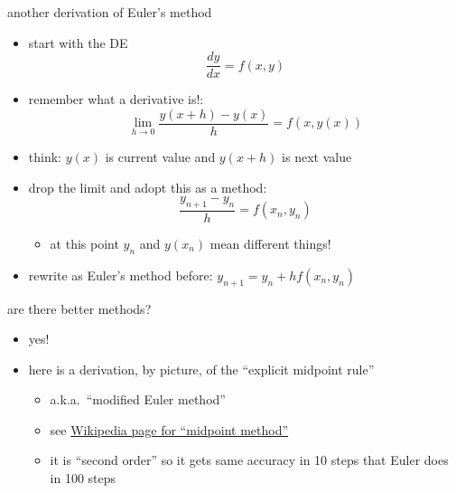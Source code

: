 \documentclass{beamer}
\begin{document}
\begin{frame}{another derivation of Euler's method}

\begin{itemize}
\item start with the DE
    $$\frac{dy}{dx} = f(x,y)$$
\item remember what a derivative is!:
    $$\lim_{h\to 0} \frac{y(x+h)-y(x)}{h} = f(x,y(x))$$
\item think: $y(x)$ is current value and $y(x+h)$ is next value
\item drop the limit and adopt this as a method:
    $$\frac{y_{n+1}-y_n}{h} = f(x_n,y_n)$$

\vspace{-2mm}
    \begin{itemize}
    \item at this point $y_n$ and $y(x_n)$ mean different things!
    \end{itemize}
\item rewrite as Euler's method before:  $y_{n+1} = y_n + h f(x_n,y_n)$
\end{itemize}
\end{frame}


\begin{frame}{are there better methods?}

\begin{itemize}
\item yes!
\item here is a derivation, by picture, of the ``explicit midpoint rule''
    \begin{itemize}
    \item a.k.a.~``modified Euler method''
    \item see \href{https://en.wikipedia.org/wiki/Midpoint_method}{\color{cyan} Wikipedia page for ``midpoint method''}
    \item it is ``second order'' so it gets same accuracy in 10 steps that Euler does in 100 steps
    \end{itemize}
\end{itemize}

\vspace{50mm}
\end{frame}
\end{document}
